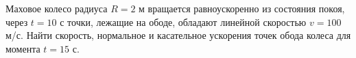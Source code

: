 Маховое колесо радиуса $R=2$ м вращается равноускоренно из состояния
покоя, через $t=10$ с точки, лежащие на ободе, обладают линейной
скоростью $v=100$ м/с. Найти скорость, нормальное и касательное
ускорения точек обода колеса для момента $t=15$ с.
